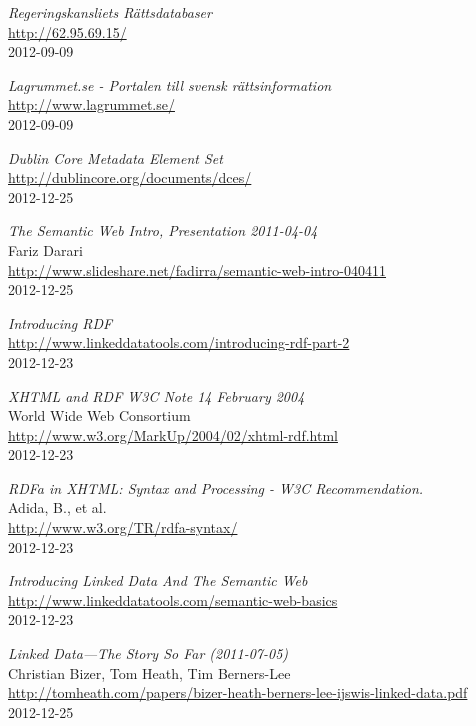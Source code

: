 \begin{thebibliography}{9}

\emph{Regeringskansliets Rättsdatabaser}\\
\url{http://62.95.69.15/}\\ 
2012-09-09

\emph{Lagrummet.se - Portalen till svensk rättsinformation}\\
\url{http://www.lagrummet.se/}\\ 
2012-09-09

\emph{Dublin Core Metadata Element Set}\\
\url{http://dublincore.org/documents/dces/}\\ 
2012-12-25

\emph{The Semantic Web Intro, Presentation 2011-04-04}\\
Fariz Darari\\
\url{http://www.slideshare.net/fadirra/semantic-web-intro-040411}\\ 
2012-12-25

\emph{Introducing RDF}\\
\url{http://www.linkeddatatools.com/introducing-rdf-part-2}\\ 
2012-12-23

\emph{XHTML and RDF W3C Note 14 February 2004}\\
World Wide Web Consortium\\
\url{http://www.w3.org/MarkUp/2004/02/xhtml-rdf.html}\\ 
2012-12-23

\emph{RDFa in XHTML: Syntax and Processing - W3C Recommendation.}\\
Adida, B., et al.\\
\url{http://www.w3.org/TR/rdfa-syntax/}\\ 
2012-12-23

\emph{Introducing Linked Data And The Semantic Web}\\
\url{http://www.linkeddatatools.com/semantic-web-basics}\\ 
2012-12-23

\emph{Linked Data—The Story So Far (2011-07-05)}\\
Christian Bizer, Tom Heath, Tim Berners-Lee\\
\url{http://tomheath.com/papers/bizer-heath-berners-lee-ijswis-linked-data.pdf}\\
2012-12-25


\end{thebibliography}
